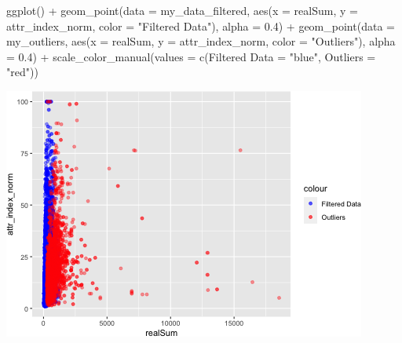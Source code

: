 \documentclass[
]{article}
\newenvironment{Shaded}{\begin{snugshade}}{\end{snugshade}}
\newcommand{\AttributeTok}[1]{\textcolor[rgb]{0.77,0.63,0.00}{#1}}
\newcommand{\FloatTok}[1]{\textcolor[rgb]{0.00,0.00,0.81}{#1}}
\newcommand{\FunctionTok}[1]{\textcolor[rgb]{0.00,0.00,0.00}{#1}}
\newcommand{\NormalTok}[1]{#1}
\newcommand{\OtherTok}[1]{\textcolor[rgb]{0.56,0.35,0.01}{#1}}
\newcommand{\SpecialCharTok}[1]{\textcolor[rgb]{0.00,0.00,0.00}{#1}}
\newcommand{\StringTok}[1]{\textcolor[rgb]{0.31,0.60,0.02}{#1}}
\begin{document}
\begin{Shaded}
\begin{Highlighting}[]
\FunctionTok{ggplot}\NormalTok{() }\SpecialCharTok{+} \FunctionTok{geom\_point}\NormalTok{(}\AttributeTok{data =}\NormalTok{ my\_data\_filtered, }\FunctionTok{aes}\NormalTok{(}\AttributeTok{x =}\NormalTok{ realSum,}
    \AttributeTok{y =}\NormalTok{ attr\_index\_norm, }\AttributeTok{color =} \StringTok{"Filtered Data"}\NormalTok{), }\AttributeTok{alpha =} \FloatTok{0.4}\NormalTok{) }\SpecialCharTok{+}
    \FunctionTok{geom\_point}\NormalTok{(}\AttributeTok{data =}\NormalTok{ my\_outliers, }\FunctionTok{aes}\NormalTok{(}\AttributeTok{x =}\NormalTok{ realSum, }\AttributeTok{y =}\NormalTok{ attr\_index\_norm,}
        \AttributeTok{color =} \StringTok{"Outliers"}\NormalTok{), }\AttributeTok{alpha =} \FloatTok{0.4}\NormalTok{) }\SpecialCharTok{+} \FunctionTok{scale\_color\_manual}\NormalTok{(}\AttributeTok{values =} \FunctionTok{c}\NormalTok{(}\StringTok{\textasciigrave{}}\AttributeTok{Filtered Data}\StringTok{\textasciigrave{}} \OtherTok{=} \StringTok{"blue"}\NormalTok{,}
    \AttributeTok{Outliers =} \StringTok{"red"}\NormalTok{))}
\end{Highlighting}
\end{Shaded}

\includegraphics{Project_files/figure-latex/unnamed-chunk-16-1.png}
\end{document}
